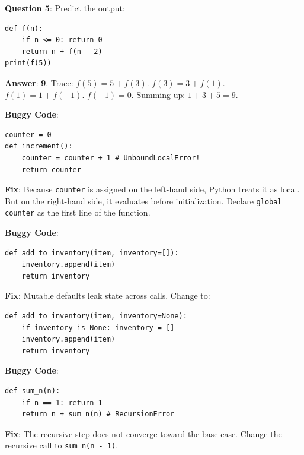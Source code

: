 \begin{outputprediction}
\textbf{Question 5}: Predict the output:
\begin{lstlisting}[language=Python3]
def f(n):
    if n <= 0: return 0
    return n + f(n - 2)
print(f(5))
\end{lstlisting}
\textbf{Answer}: \textbf{9}. Trace: $f(5) = 5 + f(3)$. $f(3) = 3 + f(1)$. $f(1) = 1 + f(-1)$. $f(-1) = 0$. Summing up: $1 + 3 + 5 = 9$.
\end{outputprediction}

\begin{debuggingbox}
\textbf{Buggy Code}:
\begin{lstlisting}[language=Python3]
counter = 0
def increment():
    counter = counter + 1 # UnboundLocalError!
    return counter
\end{lstlisting}
\textbf{Fix}: Because \texttt{counter} is assigned on the left-hand side, Python treats it as local. But on the right-hand side, it evaluates before initialization. Declare \texttt{global counter} as the first line of the function.
\end{debuggingbox}

\begin{debuggingbox}
\textbf{Buggy Code}:
\begin{lstlisting}[language=Python3]
def add_to_inventory(item, inventory=[]):
    inventory.append(item)
    return inventory
\end{lstlisting}
\textbf{Fix}: Mutable defaults leak state across calls. Change to:
\begin{lstlisting}[language=Python3]
def add_to_inventory(item, inventory=None):
    if inventory is None: inventory = []
    inventory.append(item)
    return inventory
\end{lstlisting}
\end{debuggingbox}

\begin{debuggingbox}
\textbf{Buggy Code}:
\begin{lstlisting}[language=Python3]
def sum_n(n):
    if n == 1: return 1
    return n + sum_n(n) # RecursionError
\end{lstlisting}
\textbf{Fix}: The recursive step does not converge toward the base case. Change the recursive call to \texttt{sum\_n(n - 1)}.
\end{debuggingbox}


